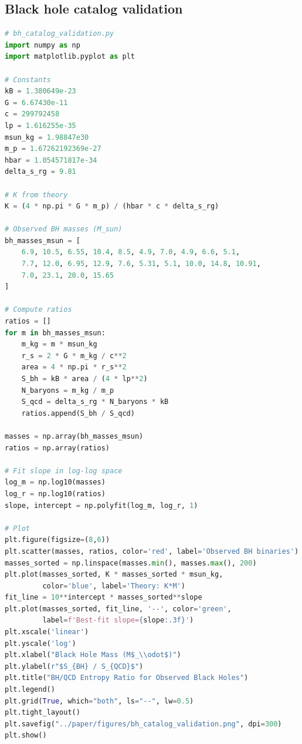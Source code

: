 \documentclass[aps,prd,onecolumn,nofootinbib,superscriptaddress]{revtex4-2}
\begin{document}
\subsection{Black hole catalog validation}
\begin{lstlisting}[language=Python]
# bh_catalog_validation.py
import numpy as np
import matplotlib.pyplot as plt

# Constants
kB = 1.380649e-23
G = 6.67430e-11
c = 299792458
lp = 1.616255e-35
msun_kg = 1.98847e30
m_p = 1.67262192369e-27
hbar = 1.054571817e-34
delta_s_rg = 9.81

# K from theory
K = (4 * np.pi * G * m_p) / (hbar * c * delta_s_rg)

# Observed BH masses (M_sun)
bh_masses_msun = [
    6.9, 10.5, 6.55, 10.4, 8.5, 4.9, 7.0, 4.9, 6.6, 5.1,
    7.7, 12.0, 6.95, 12.9, 7.6, 5.31, 5.1, 10.0, 14.8, 10.91,
    7.0, 23.1, 20.0, 15.65
]

# Compute ratios
ratios = []
for m in bh_masses_msun:
    m_kg = m * msun_kg
    r_s = 2 * G * m_kg / c**2
    area = 4 * np.pi * r_s**2
    S_bh = kB * area / (4 * lp**2)
    N_baryons = m_kg / m_p
    S_qcd = delta_s_rg * N_baryons * kB
    ratios.append(S_bh / S_qcd)

masses = np.array(bh_masses_msun)
ratios = np.array(ratios)

# Fit slope in log-log space
log_m = np.log10(masses)
log_r = np.log10(ratios)
slope, intercept = np.polyfit(log_m, log_r, 1)

# Plot
plt.figure(figsize=(8,6))
plt.scatter(masses, ratios, color='red', label='Observed BH binaries')
masses_sorted = np.linspace(masses.min(), masses.max(), 200)
plt.plot(masses_sorted, K * masses_sorted * msun_kg,
         color='blue', label='Theory: K*M')
fit_line = 10**intercept * masses_sorted**slope
plt.plot(masses_sorted, fit_line, '--', color='green',
         label=f'Best-fit slope={slope:.3f}')
plt.xscale('linear')
plt.yscale('log')
plt.xlabel("Black Hole Mass (M$_\\odot$)")
plt.ylabel(r"$S_{BH} / S_{QCD}$")
plt.title("BH/QCD Entropy Ratio for Observed Black Holes")
plt.legend()
plt.grid(True, which="both", ls="--", lw=0.5)
plt.tight_layout()
plt.savefig("../paper/figures/bh_catalog_validation.png", dpi=300)
plt.show()
\end{lstlisting}
\end{document}

